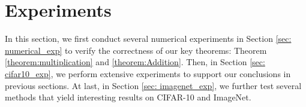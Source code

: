 \documentclass[10pt,journal,compsoc]{IEEEtran}
\begin{document}
\begin{comment}
Although $m_2$ is changing through layers, it can be calculated with
\begin{equation}
    \frac{m_2^{(l+1)}}{m_2^{(l)}}\!=\!\gamma\!\left(\!\lambda^2\alpha^2\!\left(\!e^{2m_2^{(l)}}\!cdf(-2m_2^{(l)}\!,\! N(0, m_2^{(l)}))\! -\! 2e^{\frac{m_2^{(l)}}{2}}\!cdf(-m_2^{(l)}\!,\! N(0, m_2))\! +\! \frac{1}{2}\right)\! +\! \frac{1}{2}\lambda^2m_2^{(l)}\!\right)
\label{equ:m2_selu_prop}
\end{equation}

And we provide the following algorithm that could once for all calculate $\lambda \& \alpha$ for all the layers.

\begin{algorithm}[ht]
\DontPrintSemicolon
 \KwData{the second order moment of input data: $m_2$; number of blocks: $L$; number of layers in one block: $m$; the standard deviation of weights: $\sqrt{\frac{\gamma}{n}}$; Factor $p$.}
 \KwResult{An $[L\times m, 2]$ matrix of the optimal $\lambda, \alpha$ for all the layers}
 \Begin{
 SeLU\_params = []\\
 \For{$l \in range(L)$}{
 $m_2^{(in)} = m_2$\\
 \For{$i \in range(m)$}{
 $[\lambda, \alpha] = solve$ \eqref{equ:solution_of_selu_resnet_fixup}$\backslash$ \eqref{equ:solution_of_selu_resnet}\\
 SeLU\_params.append($[\lambda, \alpha]$)\\
 $m_2 = $\eqref{equ:m2_selu_prop}[$m_2, \lambda, \alpha$]
 \;
 }
 $m_2 = m_2^{(in)} + m_2$\;
 }
 }
 \Return{SeLU\_params}
 \caption{SeLU for ResNet}
 \label{Alg:selu_res}
\end{algorithm} 

\end{comment}
 
\section{Experiments} 
In this section, we first conduct several numerical experiments in Section \ref{sec: numerical_exp} to verify the correctness of our key theorems: Theorem \ref{theorem:multiplication} and \ref{theorem:Addition}. Then, in Section \ref{sec: cifar10_exp}, we perform extensive experiments to support our conclusions in previous sections. At last, in Section \ref{sec: imagenet_exp}, we further test several methods that yield interesting results on CIFAR-10 and ImageNet.
\end{document}
